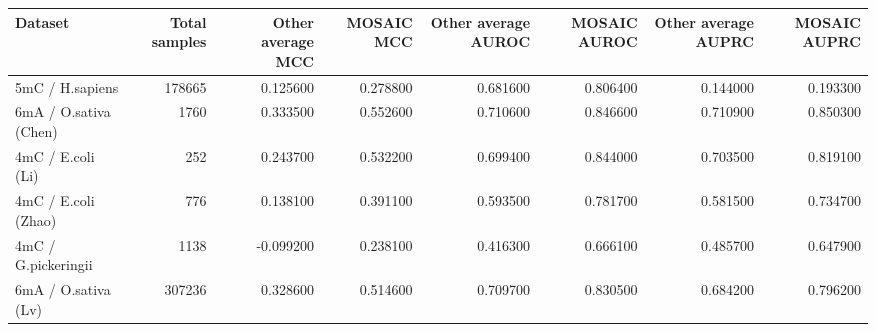 \begin{tabular}{lrrrrrrr}
\toprule
Dataset & Total samples & Other average MCC & MOSAIC MCC & Other average AUROC & MOSAIC AUROC & Other average AUPRC & MOSAIC AUPRC \\
\midrule
5mC / H.sapiens & 178665 & 0.125600 & 0.278800 & 0.681600 & 0.806400 & 0.144000 & 0.193300 \\
6mA / O.sativa (Chen) & 1760 & 0.333500 & 0.552600 & 0.710600 & 0.846600 & 0.710900 & 0.850300 \\
4mC / E.coli (Li) & 252 & 0.243700 & 0.532200 & 0.699400 & 0.844000 & 0.703500 & 0.819100 \\
4mC / E.coli (Zhao) & 776 & 0.138100 & 0.391100 & 0.593500 & 0.781700 & 0.581500 & 0.734700 \\
4mC / G.pickeringii & 1138 & -0.099200 & 0.238100 & 0.416300 & 0.666100 & 0.485700 & 0.647900 \\
6mA / O.sativa (Lv) & 307236 & 0.328600 & 0.514600 & 0.709700 & 0.830500 & 0.684200 & 0.796200 \\
\bottomrule
\end{tabular}
